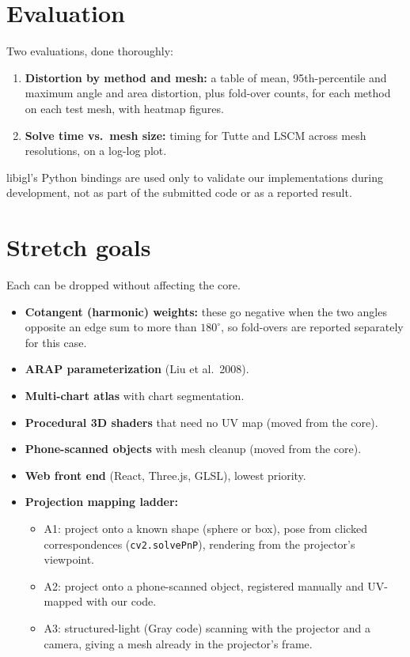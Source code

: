 \documentclass[11pt]{article}
\begin{document}
\section{Evaluation}
Two evaluations, done thoroughly:
\begin{enumerate}
  \item \textbf{Distortion by method and mesh:} a table of mean, 95th-percentile and maximum angle and area
        distortion, plus fold-over counts, for each method on each test mesh, with heatmap figures.
  \item \textbf{Solve time vs.\ mesh size:} timing for Tutte and LSCM across mesh resolutions, on a log-log plot.
\end{enumerate}
libigl's Python bindings are used only to validate our implementations during development, not as part of the
submitted code or as a reported result.

\section{Stretch goals}
Each can be dropped without affecting the core.
\begin{itemize}
  \item \textbf{Cotangent (harmonic) weights:} these go negative when the two angles opposite an edge sum to more
        than $180^\circ$, so fold-overs are reported separately for this case.
  \item \textbf{ARAP parameterization} (Liu et al.\ 2008).
  \item \textbf{Multi-chart atlas} with chart segmentation.
  \item \textbf{Procedural 3D shaders} that need no UV map (moved from the core).
  \item \textbf{Phone-scanned objects} with mesh cleanup (moved from the core).
  \item \textbf{Web front end} (React, Three.js, GLSL), lowest priority.
  \item \textbf{Projection mapping ladder:}
        \begin{itemize}
          \item A1: project onto a known shape (sphere or box), pose from clicked correspondences
                (\texttt{cv2.solvePnP}), rendering from the projector's viewpoint.
          \item A2: project onto a phone-scanned object, registered manually and UV-mapped with our code.
          \item A3: structured-light (Gray code) scanning with the projector and a camera, giving a mesh already in
                the projector's frame.
        \end{itemize}
\end{itemize}
\end{document}

